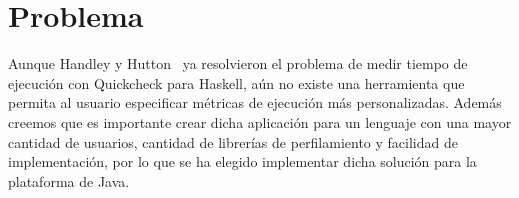 \section{Problema}
Aunque Handley y Hutton~\cite{Handley:2018:ACT:3242744.3242749} ya resolvieron
el problema de medir tiempo de ejecución con Quickcheck para Haskell, aún no
existe una herramienta que permita al usuario especificar métricas de ejecución
más personalizadas.
Además creemos que es importante crear dicha aplicación para un lenguaje con una
mayor cantidad de usuarios, cantidad de librerías de perfilamiento y facilidad
de implementación, por lo que se ha elegido implementar dicha solución para la
plataforma de Java.
